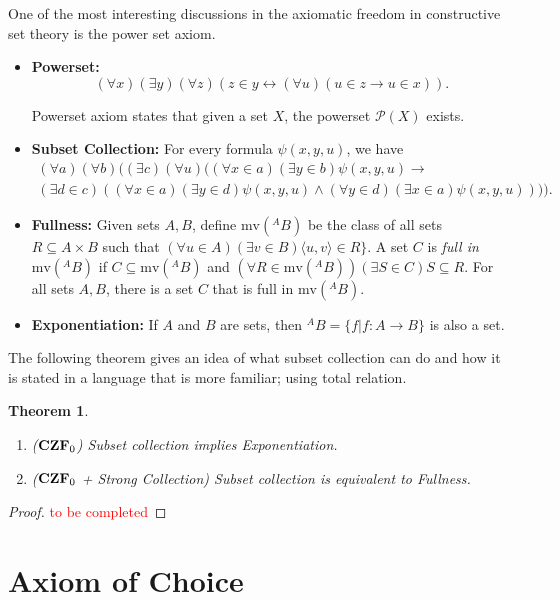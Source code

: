\documentclass[12pt, a4paper]{article}
\theoremstyle{definition}
\theoremstyle{plain}
\newtheorem{theorem}{Theorem}
\begin{document}
One of the most interesting discussions in  the axiomatic freedom in constructive set theory is the power set axiom.
\begin{itemize}
\item {\bf Powerset:}
$$(\forall x)(\exists y)(\forall z)(z \in y \leftrightarrow (\forall u)(u \in z \rightarrow u \in x)).$$

Powerset axiom states that given a set $X$, the powerset $\mathcal{P}(X)$ exists. 

\item {\bf Subset Collection:} For every formula $\psi(x,y,u)$, we have
\begin{align*}(\forall a)(\forall b)((\exists c)(\forall u)((\forall x \in a)(\exists y \in b)\psi(x,y,u) \rightarrow \\ 
(\exists d \in c)((\forall x \in a)(\exists y \in d)\psi(x,y,u) \wedge (\forall y \in d)(\exists x \in a) \psi(x,y,u)))).
\end{align*}

\item {\bf Fullness:} Given sets $A,B$, define $\text{mv}(^A B)$ be the class of all sets $R \subseteq A \times B$ such that $(\forall u \in A)(\exists v \in B) \langle u,v \rangle \in R\}$. A set $C$ is \emph{full in} $\text{mv}(^A B)$ if $C \subseteq \text{mv}(^A B)$ and $(\forall R \in \text{mv}(^A B))(\exists S \in C)S \subseteq R$. For all sets $A,B$, there is a set $C$ that is full in $\text{mv}(^A B)$.


\item {\bf Exponentiation:} If $A$ and $B$ are sets, then $^A B=\{f|f:A \rightarrow B\}$ is also a set.
\end{itemize}

The following theorem gives an idea of what subset collection can do and how it is stated in a language that is more familiar; using total relation.
\begin{theorem}
\begin{enumerate}
\item (${\bf CZF}_0$) Subset collection implies Exponentiation.
\item (${\bf CZF}_0$ + Strong Collection) Subset collection is equivalent to Fullness.
\end{enumerate}
\end{theorem}

\begin{proof}
\textcolor{red}{to be completed}
\end{proof}


\section{Axiom of Choice}
\end{document}
